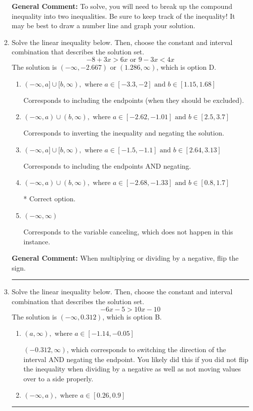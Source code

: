 \documentclass{extbook}[14pt]
\newcommand{\litem}[1]{\item #1

\rule{\textwidth}{0.4pt}}
\begin{document}
\begin{enumerate}
{\begin{enumerate}[label=\Alph*.]
\end{enumerate}

\textbf{General Comment:} To solve, you will need to break up the compound inequality into two inequalities. Be sure to keep track of the inequality! It may be best to draw a number line and graph your solution.
}
\litem{
Solve the linear inequality below. Then, choose the constant and interval combination that describes the solution set.
\[ -8 + 3 x > 6 x \text{ or } 9 - 3 x < 4 x \]The solution is \( (-\infty, -2.667) \text{ or } (1.286, \infty) \), which is option D.\begin{enumerate}[label=\Alph*.]
\item \( (-\infty, a] \cup [b, \infty), \text{ where } a \in [-3.3, -2] \text{ and } b \in [1.15, 1.68] \)

Corresponds to including the endpoints (when they should be excluded).
\item \( (-\infty, a) \cup (b, \infty), \text{ where } a \in [-2.62, -1.01] \text{ and } b \in [2.5, 3.7] \)

Corresponds to inverting the inequality and negating the solution.
\item \( (-\infty, a] \cup [b, \infty), \text{ where } a \in [-1.5, -1.1] \text{ and } b \in [2.64, 3.13] \)

Corresponds to including the endpoints AND negating.
\item \( (-\infty, a) \cup (b, \infty), \text{ where } a \in [-2.68, -1.33] \text{ and } b \in [0.8, 1.7] \)

 * Correct option.
\item \( (-\infty, \infty) \)

Corresponds to the variable canceling, which does not happen in this instance.
\end{enumerate}

\textbf{General Comment:} When multiplying or dividing by a negative, flip the sign.
}
\litem{
Solve the linear inequality below. Then, choose the constant and interval combination that describes the solution set.
\[ -6x -5 > 10x -10 \]The solution is \( (-\infty, 0.312) \), which is option B.\begin{enumerate}[label=\Alph*.]
\item \( (a, \infty), \text{ where } a \in [-1.14, -0.05] \)

 $(-0.312, \infty)$, which corresponds to switching the direction of the interval AND negating the endpoint. You likely did this if you did not flip the inequality when dividing by a negative as well as not moving values over to a side properly.
\item \( (-\infty, a), \text{ where } a \in [0.26, 0.9] \)


\end{enumerate}}
\end{enumerate}
\end{document}
